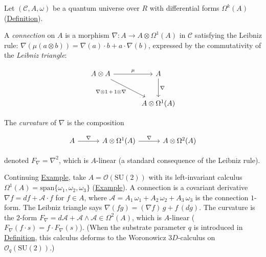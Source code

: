 \begin{definition}
  \label{def:categorical-connection}
Let $(\mathcal{C}, A, \omega)$ be a quantum universe over $R$ with
differential forms $\Omega^k(A)$ (\hyperref[def:higher-forms]{Definition}).

A \emph{connection} on $A$ is a morphism
$\nabla \colon A \to A \otimes \Omega^1(A)$ in $\mathcal{C}$ satisfying
the Leibniz rule: $\nabla(\mu(a \otimes b)) =
\nabla(a) \cdot b + a \cdot \nabla(b)$, expressed by the commutativity
of the \emph{Leibniz triangle}:

\begin{equation}\label{eq:leibniz-triangle}
\begin{tikzcd}[row sep=2.5em, column sep=3.5em]
  A \otimes A
    \ar[r, "\mu"]
    \ar[dr, "{\nabla \otimes 1 \,+\, 1 \otimes \nabla}"']
  & A \ar[d, "\nabla"]
  \\
  & A \otimes \Omega^1(A)
\end{tikzcd}
\end{equation}

The \emph{curvature} of $\nabla$ is the composition

\begin{equation}\label{eq:curvature-composition}
\begin{tikzcd}[column sep=3em]
  A \ar[r, "\nabla"]
  & A \otimes \Omega^1(A) \ar[r, "\nabla"]
  & A \otimes \Omega^2(A)
\end{tikzcd}
\end{equation}

denoted $F_\nabla = \nabla^2$, which is $A$-linear (a standard
consequence of the Leibniz rule).
\end{definition}

\begin{example}
  \label{ex:connection-su2}
Continuing \hyperref[ex:fiber-adjoint-su2]{Example}, take
$A = \mathcal{O}(\mathrm{SU}(2))$ with its left-invariant calculus
$\Omega^1(A) = \mathrm{span}\{\omega_1, \omega_2, \omega_3\}$
(\hyperref[ex:higher-forms-su2]{Example}). A
connection is a covariant derivative
$\nabla f = df + \mathcal{A} \cdot f$ for $f \in A$, where
$\mathcal{A} = A_1\,\omega_1 + A_2\,\omega_2 + A_3\,\omega_3$ is the
connection $1$-form. The Leibniz triangle says
$\nabla(fg) = (\nabla f)\,g + f\,(dg)$. The curvature is the $2$-form
$F_\nabla = d\mathcal{A} + \mathcal{A} \wedge \mathcal{A} \in \Omega^2(A)$,
which is $A$-linear ($F_\nabla(f \cdot s) = f \cdot F_\nabla(s)$).
(When the substrate parameter $q$ is introduced in
\hyperref[def:substrate-parameter]{Definition}, this calculus deforms to the
Woronowicz $3D$-calculus on $\mathcal{O}_q(\mathrm{SU}(2))$.)
\end{example}

